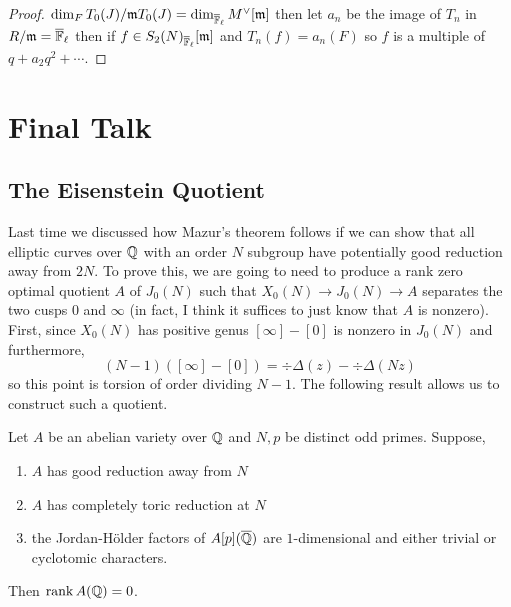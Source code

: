 \documentclass[12pt]{article}
\begin{document}
\begin{proof}
$\dim_F T_0(J) / \mathfrak{m} T_0(J) = \dim_{\overline{\mathbb{F}}_\ell} M^\vee[\mathfrak{m}]$ then let $a_n$ be the image of $T_n$ in $R / \mathfrak{m} = \overline{\mathbb{F}}_\ell$ then if $f \in S_2(N)_{\overline{\mathbb{F}}_\ell}[\mathfrak{m}]$ and $T_n(f) = a_n(F)$ so $f$ is a multiple of $q + a_2 q^2 + \cdots$. 
\end{proof}

\section{Final Talk}


\subsection{The Eisenstein Quotient}

Last time we discussed how Mazur's theorem follows if we can show that all elliptic curves over $\mathbb{Q}$ with an order $N$ subgroup have potentially good reduction away from $2 N$. To prove this, we are going to need to produce a rank zero optimal quotient $A$ of $J_0(N)$ such that $X_0(N) \to J_0(N) \to A$ separates the two cusps $0$ and $\infty$ (in fact, I think it suffices to just know that $A$ is nonzero). First, since $X_0(N)$ has positive genus $[\infty] - [0]$ is nonzero in $J_0(N)$ and furthermore,
\[ (N-1) ([\infty] - [0]) = \div{\Delta(z)} - \div{\Delta(N z)} \]
so this point is torsion of order dividing $N-1$. The following result allows us to construct such a quotient.

\begin{theorem}
Let $A$ be an abelian variety over $\mathbb{Q}$ and $N, p$ be distinct odd primes. Suppose,
\begin{enumerate}
\item $A$ has good reduction away from $N$
\item $A$ has completely toric reduction at $N$
\item the Jordan-H\"{o}lder factors of $A[p](\overline{\mathbb{Q}})$ are $1$-dimensional and either trivial or cyclotomic characters. 
\end{enumerate}
Then $\operatorname{\mathrm{rank}} A(\mathbb{Q}) = 0$.
\end{theorem}

\newcommand{\fppf}{\mathrm{fppf}}
\end{document}
